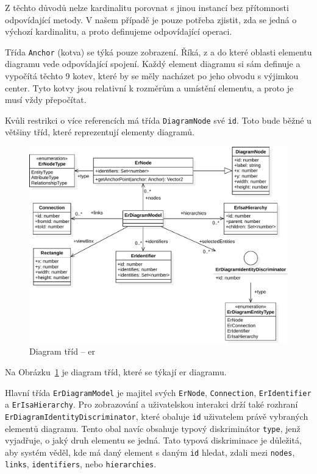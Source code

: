 Z těchto důvodů nelze kardinalitu porovnat s jinou instancí bez přítomnosti odpovídající metody.
V našem případě je pouze potřeba zjistit, zda se jedná o výchozí kardinalitu, a proto definujeme odpovídající operaci.

Třída \texttt{Anchor} (kotva) se týká pouze zobrazení.
Říká, z a do které oblasti elementu diagramu vede odpovídající spojení.
Každý element diagramu si sám definuje a vypočítá těchto 9 kotev, které by se měly nacházet po jeho obvodu s výjimkou center.
Tyto kotvy jsou relativní k rozměrům a umístění elementu, a proto je musí vždy přepočítat.

Kvůli restrikci o více referencích má třída \texttt{DiagramNode} své \texttt{id}.
Toto bude běžné u většiny tříd, které reprezentují elementy diagramů.

\begin{figure}[!htb]
  \centering
  \includegraphics[width=\maxwidth{\textwidth}]{../img/diagrams/er-class-diagram.pdf}
  \caption{Diagram tříd -- \acrshort{er}}
  \label{fig:er-class-diagram}
\end{figure}

Na Obrázku~\ref{fig:er-class-diagram} je diagram tříd, které se týkají \acrshort{er} diagramu.

Hlavní třída \texttt{ErDiagramModel} je majitel svých \texttt{ErNode}, \texttt{Connection}, \texttt{ErIdentifier} a \texttt{ErIsaHierarchy}.
Pro zobrazování a uživatelskou interakci drží také rozhraní \texttt{ErDiagramIdentityDiscriminator}, které obaluje \texttt{id} uživatelem právě vybraných elementů diagramu.
Tento obal navíc obsahuje typový diskriminátor \texttt{type}, jenž vyjadřuje, o jaký druh elementu se jedná.
Tato typová diskriminace je důležitá, aby systém věděl, kde má daný element s daným \texttt{id} hledat, zdali mezi \texttt{nodes}, \texttt{links}, \texttt{identifiers}, nebo \texttt{hierarchies}.


